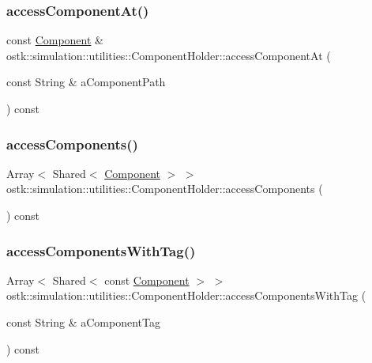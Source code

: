 \subsubsection{\texorpdfstring{access\+Component\+At()}{accessComponentAt()}}
{\footnotesize\ttfamily const \hyperlink{classostk_1_1simulation_1_1_component}{Component} \& ostk\+::simulation\+::utilities\+::\+Component\+Holder\+::access\+Component\+At (\begin{DoxyParamCaption}\item[{const String \&}]{a\+Component\+Path }\end{DoxyParamCaption}) const}

\mbox{\label{classostk_1_1simulation_1_1utilities_1_1_component_holder_a71d4e98af453e82bf1257d926b29fe78}} 
\subsubsection{\texorpdfstring{access\+Components()}{accessComponents()}}
{\footnotesize\ttfamily Array$<$ Shared$<$ \hyperlink{classostk_1_1simulation_1_1_component}{Component} $>$ $>$ ostk\+::simulation\+::utilities\+::\+Component\+Holder\+::access\+Components (\begin{DoxyParamCaption}{ }\end{DoxyParamCaption}) const}

\mbox{\label{classostk_1_1simulation_1_1utilities_1_1_component_holder_a8dd785dcaa575278edd76cd14a245e1d}} 
\subsubsection{\texorpdfstring{access\+Components\+With\+Tag()}{accessComponentsWithTag()}}
{\footnotesize\ttfamily Array$<$ Shared$<$ const \hyperlink{classostk_1_1simulation_1_1_component}{Component} $>$ $>$ ostk\+::simulation\+::utilities\+::\+Component\+Holder\+::access\+Components\+With\+Tag (\begin{DoxyParamCaption}\item[{const String \&}]{a\+Component\+Tag }\end{DoxyParamCaption}) const}

